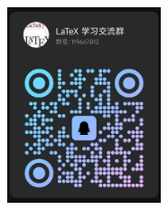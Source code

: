 \documentclass{libs/SUSTech_format}
\begin{document}





% 
% 
% 



{
	\begin{frame}{}
		\centering
		{\huge{\textbf{}}\\}
			\begin{figure}
				\includegraphics[width=0.4\textwidth]{latex_qq_group.jpg}
			\end{figure}
	\end{frame}
}
\end{document}
